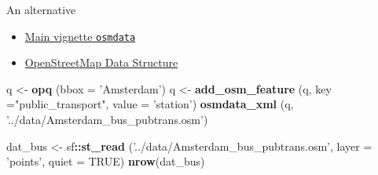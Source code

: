 \documentclass[ignorenonframetext,]{beamer}
\newenvironment{Shaded}{\begin{snugshade}}{\end{snugshade}}
\newcommand{\DataTypeTok}[1]{\textcolor[rgb]{0.13,0.29,0.53}{#1}}
\newcommand{\KeywordTok}[1]{\textcolor[rgb]{0.13,0.29,0.53}{\textbf{#1}}}
\newcommand{\NormalTok}[1]{#1}
\newcommand{\OperatorTok}[1]{\textcolor[rgb]{0.81,0.36,0.00}{\textbf{#1}}}
\newcommand{\OtherTok}[1]{\textcolor[rgb]{0.56,0.35,0.01}{#1}}
\newcommand{\StringTok}[1]{\textcolor[rgb]{0.31,0.60,0.02}{#1}}
\providecommand{\tightlist}{%
  \setlength{\itemsep}{0pt}\setlength{\parskip}{0pt}}
\begin{document}
\begin{frame}[fragile]{An alternative}
\protect\hypertarget{an-alternative}{}

\begin{itemize}
\tightlist
\item
  \href{https://github.com/ropensci/osmdata/blob/master/vignettes/osmdata.Rmd}{Main
  vignette \texttt{osmdata}}
\item
  \href{https://cran.r-project.org/web/packages/osmdata/vignettes/osm-sf-translation.html}{OpenStreetMap
  Data Structure}
\end{itemize}

\begin{Shaded}
\begin{Highlighting}[]
\NormalTok{q <-}\StringTok{ }\KeywordTok{opq}\NormalTok{ (}\DataTypeTok{bbox =} \StringTok{'Amsterdam'}\NormalTok{)}
\NormalTok{q <-}\StringTok{ }\KeywordTok{add_osm_feature}\NormalTok{ (q, }\DataTypeTok{key =}\StringTok{"public_transport"}\NormalTok{,}
                      \DataTypeTok{value =} \StringTok{'station'}\NormalTok{) }
\KeywordTok{osmdata_xml}\NormalTok{ (q, }\StringTok{'../data/Amsterdam_bus_pubtrans.osm'}\NormalTok{)}
\end{Highlighting}
\end{Shaded}

\begin{Shaded}
\begin{Highlighting}[]
\NormalTok{dat_bus <-}\StringTok{ }\NormalTok{sf}\OperatorTok{::}\KeywordTok{st_read}\NormalTok{ (}\StringTok{'../data/Amsterdam_bus_pubtrans.osm'}\NormalTok{, }
                        \DataTypeTok{layer =} \StringTok{'points'}\NormalTok{, }\DataTypeTok{quiet =} \OtherTok{TRUE}\NormalTok{)}
\KeywordTok{nrow}\NormalTok{(dat_bus)}
\end{Highlighting}
\end{Shaded}

\end{frame}
\end{document}
